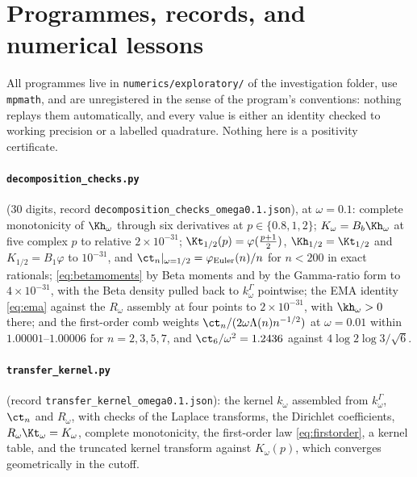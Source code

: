 \section{Programmes, records, and numerical lessons}\label{app:numerics}

All programmes live in \texttt{numerics/exploratory/} of the investigation
folder, use \texttt{mpmath}, and are unregistered in the sense of the
program's conventions: nothing replays them automatically, and every value is
either an identity checked to working precision or a labelled quadrature.
Nothing here is a positivity certificate.

\paragraph{\texttt{decomposition\_checks.py}} (30 digits, record
\texttt{decomposition\_checks\_omega0.1.json}), at $\omega=0.1$: complete
monotonicity of $\Kh_\omega$ through six derivatives at $p\in\{0.8,1,2\}$;
$K_\omega=B_b\Kh_\omega$ at five complex $p$ to relative $2\times10^{-31}$;
$\Kt_{1/2}(p)=\varphi(\frac{p+1}2)$, $\Kh_{1/2}=\Kt_{1/2}$ and $K_{1/2}=B_1\varphi$
to $10^{-31}$, and $\ct_n|_{\omega=1/2}=\varphi_{\mathrm{Euler}}(n)/n$ for
$n<200$ in exact rationals; \eqref{eq:betamoments} by Beta moments and by the
Gamma-ratio form to $4\times10^{-31}$, with the Beta density pulled back to
$k^\Gamma_\omega$ pointwise; the EMA identity \eqref{eq:ema} against the
$R_\omega$ assembly at four points to $2\times10^{-31}$, with $\kh_\omega>0$
there; and the first-order comb weights $\ct_n/(2\omega\Lambda(n)n^{-1/2})$ at
$\omega=0.01$ within $1.00001$--$1.00006$ for $n=2,3,5,7$, and
$\ct_6/\omega^2=1.2436$ against $4\log2\log3/\sqrt6$.

\paragraph{\texttt{transfer\_kernel.py}} (record
\texttt{transfer\_kernel\_omega0.1.json}): the kernel $k_\omega$ assembled from
$k^\Gamma_\omega$, $\ct_n$ and $R_\omega$, with checks of the Laplace
transforms, the Dirichlet coefficients, $R_\omega\Kt_\omega=K_\omega$, complete
monotonicity, the first-order law \eqref{eq:firstorder}, a kernel table, and
the truncated kernel transform against $K_\omega(p)$, which converges
geometrically in the cutoff.

